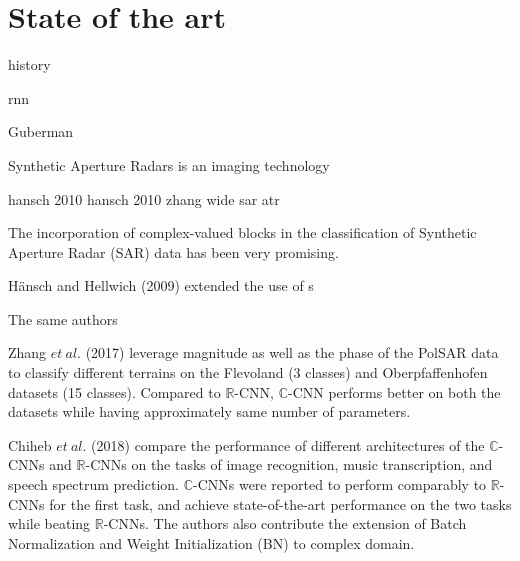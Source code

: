 \chapter{State of the art}\label{chap:comp}

history

rnn

Guberman

Synthetic Aperture Radars is an imaging technology

 
hansch 2010 hansch 2010 zhang wide sar atr

The incorporation of complex-valued blocks in the classification of Synthetic Aperture Radar (SAR) data has been very promising. 

H\"{a}nsch and Hellwich (2009) extended the use of s




The same authors



Zhang $et \ al.$ (2017) \cite{polsarzhang2017complex} leverage magnitude as well as the phase of the PolSAR data to classify different terrains on the Flevoland (3 classes) and Oberpfaffenhofen datasets (15 classes). Compared to $\mathbb{R}$-CNN, $\mathbb{C}$-CNN performs better on both the datasets while having approximately same number of parameters.  



Chiheb $et \ al.$ (2018) \cite{trabelsi2018deep} compare the performance of different architectures of the $\mathbb{C}$-CNNs and $\mathbb{R}$-CNNs on the tasks of image recognition, music transcription, and speech spectrum prediction. $\mathbb{C}$-CNNs were reported to perform comparably to $\mathbb{R}$-CNNs for the first task, and achieve state-of-the-art performance on the two tasks while beating $\mathbb{R}$-CNNs. The authors also contribute the extension of Batch Normalization and Weight Initialization (BN) to complex domain. 